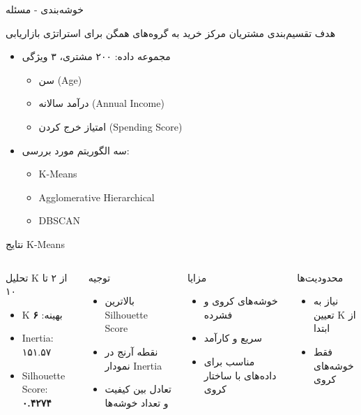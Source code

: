 \documentclass[aspectratio=169]{beamer}
\begin{document}
\begin{frame}{خوشه‌بندی - مسئله}
\begin{block}{هدف}
تقسیم‌بندی مشتریان مرکز خرید به گروه‌های همگن برای استراتژی بازاریابی
\end{block}
\begin{itemize}
\item مجموعه داده: ۲۰۰ مشتری، ۳ ویژگی
\begin{itemize}
\item سن (Age)
\item درآمد سالانه (Annual Income)
\item امتیاز خرج کردن (Spending Score)
\end{itemize}
\item سه الگوریتم مورد بررسی:
\begin{itemize}
\item K-Means
\item Agglomerative Hierarchical
\item DBSCAN
\end{itemize}
\end{itemize}
\end{frame}

\begin{frame}{نتایج K-Means}
\begin{columns}
\begin{block}{تحلیل K از ۲ تا ۱۰}
\begin{itemize}
\item K بهینه: \textbf{۶}
\item Inertia: ۱۵۱.۵۷
\item Silhouette Score: \textbf{۰.۴۲۷۴}
\end{itemize}
\end{block}

\begin{block}{توجیه}
\begin{itemize}
\item بالاترین Silhouette Score
\item نقطه آرنج در نمودار Inertia
\item تعادل بین کیفیت و تعداد خوشه‌ها
\end{itemize}
\end{block}

\begin{block}{مزایا}
\begin{itemize}
\item خوشه‌های کروی و فشرده
\item سریع و کارآمد
\item مناسب برای داده‌های با ساختار کروی
\end{itemize}
\end{block}

\begin{block}{محدودیت‌ها}
\begin{itemize}
\item نیاز به تعیین K از ابتدا
\item فقط خوشه‌های کروی
\end{itemize}
\end{block}
\end{columns}
\end{frame}
\end{document}
